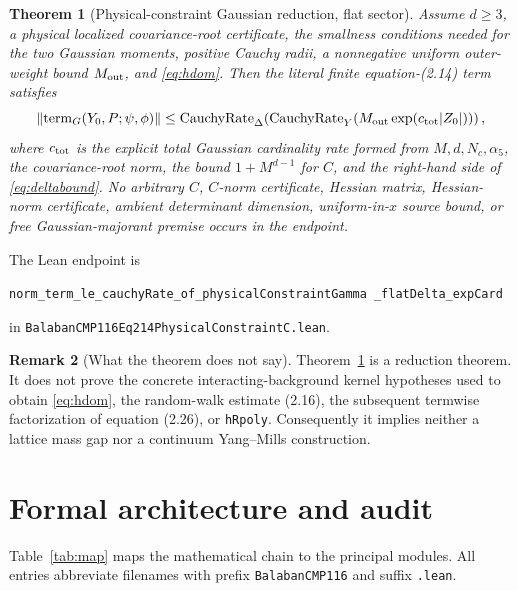 \documentclass[11pt,a4paper]{article}
\newtheorem{theorem}{Theorem}[section]
\theoremstyle{definition}
\newtheorem{remark}[theorem]{Remark}
\newcommand{\lean}[1]{\texttt{#1}}
\begin{document}
\begin{theorem}[Physical-constraint Gaussian reduction, flat sector]
\label{thm:main}
Assume $d\ge3$, a physical localized covariance-root certificate, the
smallness conditions needed for the two Gaussian moments, positive Cauchy
radii, a nonnegative uniform outer-weight bound $M_{\rm out}$, and
\eqref{eq:hdom}.  Then the literal finite equation-(2.14) term satisfies
\begin{equation}\label{eq:terminal}
 \lVert\operatorname{term}_{G}(Y_0,P;\psi,\phi)\rVert
 \le
 \operatorname{CauchyRate}_{\Delta}\!\left(
   \operatorname{CauchyRate}_{Y}\!\left(
    M_{\rm out}\exp(c_{\rm tot}|Z_0|)\right)\right),
\end{equation}
where $c_{\rm tot}$ is the explicit total Gaussian cardinality rate formed
from $M,d,N_c,\alpha_5$, the covariance-root norm, the bound
$1+M^{d-1}$ for $C$, and the right-hand side of
\eqref{eq:deltabound}.  No arbitrary $C$, $C$-norm certificate, Hessian matrix,
Hessian-norm certificate, ambient determinant dimension, uniform-in-$x$
source bound, or free Gaussian-majorant premise occurs in the endpoint.
\end{theorem}

The Lean endpoint is
\begin{center}\small
\nolinkurl{norm_term_le_cauchyRate_of_physicalConstraintGamma}\
\nolinkurl{\_flatDelta_expCard}
\end{center}
in \lean{BalabanCMP116Eq214PhysicalConstraintC.lean}.

\begin{remark}[What the theorem does not say]
Theorem~\ref{thm:main} is a reduction theorem.  It does not prove
the concrete interacting-background kernel hypotheses used to obtain
\eqref{eq:hdom}, the random-walk estimate (2.16), the subsequent termwise
factorization of equation (2.26), or \lean{hRpoly}.
Consequently it implies neither a lattice mass gap nor a continuum
Yang--Mills construction.
\end{remark}

\section{Formal architecture and audit}

Table~\ref{tab:map} maps the mathematical chain to the principal modules.
All entries abbreviate filenames with prefix \lean{BalabanCMP116} and suffix
\lean{.lean}.
\end{document}
